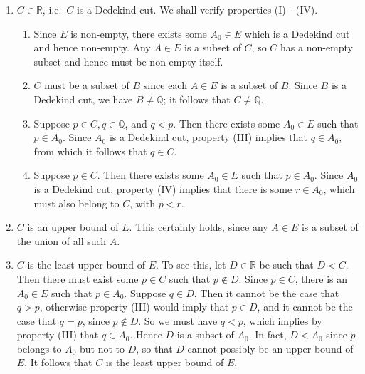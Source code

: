 \documentclass[12pt]{article}
\theoremstyle{definition}
\begin{document}
\begin{enumerate}[label = (S\arabic*)]
    \item \( C \in \mathbb{R} \), i.e.\ \( C \) is a Dedekind cut. We shall verify properties (I) - (IV).
    
    \begin{enumerate}[label = (\Roman*)]
        \item Since \( E \) is non-empty, there exists some \( A_0 \in E \) which is a Dedekind cut and hence non-empty. Any \( A \in E \) is a subset of \( C \), so \( C \) has a non-empty subset and hence must be non-empty itself.
        
        \item \( C \) must be a subset of \( B \) since each \( A \in E \) is a subset of \( B \). Since \( B \) is a Dedekind cut, we have \( B \neq \mathbb{Q} \); it follows that \( C \neq \mathbb{Q} \).
        
        \item Suppose \( p \in C, q \in \mathbb{Q} \), and \( q < p \). Then there exists some \( A_0 \in E \) such that \( p \in A_0 \). Since \( A_0 \) is a Dedekind cut, property (III) implies that \( q \in A_0 \), from which it follows that \( q \in C \).
        
        \item Suppose \( p \in C \). Then there exists some \( A_0 \in E \) such that \( p \in A_0 \). Since \( A_0 \) is a Dedekind cut, property (IV) implies that there is some \( r \in A_0 \), which must also belong to \( C \), with \( p < r \).
    \end{enumerate}
    
    \item \( C \) is an upper bound of \( E \). This certainly holds, since any \( A \in E \) is a subset of the union of all such \( A \).
    
    \item \( C \) is the least upper bound of \( E \). To see this, let \( D \in \mathbb{R} \) be such that \( D < C \). Then there must exist some \( p \in C \) such that \( p \not\in D \). Since \( p \in C \), there is an \( A_0 \in E \) such that \( p \in A_0 \). Suppose \( q \in D \). Then it cannot be the case that \( q > p \), otherwise property (III) would imply that \( p \in D \), and it cannot be the case that \( q = p \), since \( p \not\in D \). So we must have \( q < p \), which implies by property (III) that \( q \in A_0 \). Hence \( D \) is a subset of \( A_0 \). In fact, \( D < A_0 \) since \( p \) belongs to \( A_0 \) but not to \( D \), so that \( D \) cannot possibly be an upper bound of \( E \). It follows that \( C \) is the least upper bound of \( E \).
\end{enumerate}
\end{document}
